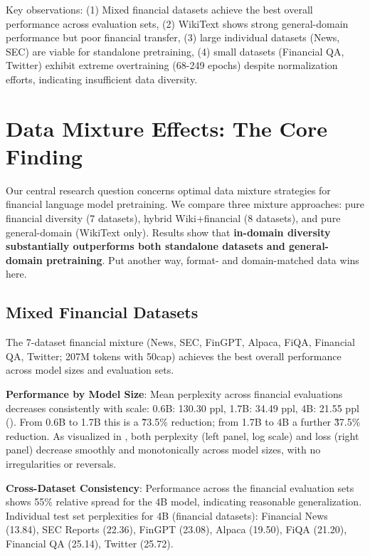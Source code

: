 Key observations: (1) Mixed financial datasets achieve the best overall performance across evaluation sets, (2) WikiText shows strong general-domain performance but poor financial transfer, (3) large individual datasets (News, SEC) are viable for standalone pretraining, (4) small datasets (Financial QA, Twitter) exhibit extreme overtraining (68-249 epochs) despite normalization efforts, indicating insufficient data diversity.

\section{Data Mixture Effects: The Core Finding}

Our central research question concerns optimal data mixture strategies for financial language model pretraining. We compare three mixture approaches: pure financial diversity (7 datasets), hybrid Wiki+financial (8 datasets), and pure general-domain (WikiText only). Results show that \textbf{in-domain diversity substantially outperforms both standalone datasets and general-domain pretraining}. Put another way, format- and domain-matched data wins here.

\subsection{Mixed Financial Datasets}

The 7-dataset financial mixture (News, SEC, FinGPT, Alpaca, FiQA, Financial QA, Twitter; 207M tokens with 50cap) achieves the best overall performance across model sizes and evaluation sets.

\textbf{Performance by Model Size}: Mean perplexity across financial evaluations decreases consistently with scale: 0.6B: 130.30 ppl, 1.7B: 34.49 ppl, 4B: 21.55 ppl (). From 0.6B to 1.7B this is a \~73.5\% reduction; from 1.7B to 4B a further \~37.5\% reduction. As visualized in , both perplexity (left panel, log scale) and loss (right panel) decrease smoothly and monotonically across model sizes, with no irregularities or reversals.

\textbf{Cross-Dataset Consistency}: Performance across the financial evaluation sets shows 55\% relative spread for the 4B model, indicating reasonable generalization. Individual test set perplexities for 4B (financial datasets): Financial News (13.84), SEC Reports (22.36), FinGPT (23.08), Alpaca (19.50), FiQA (21.20), Financial QA (25.14), Twitter (25.72).

